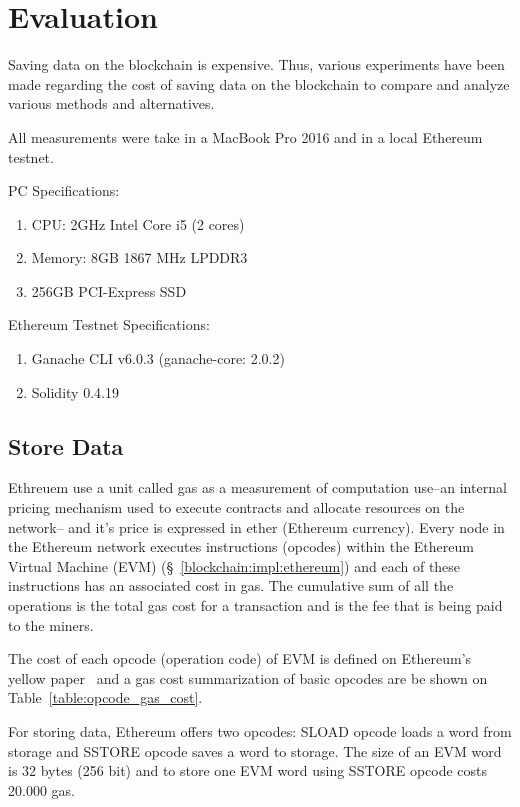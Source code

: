 \chapter{Evaluation}
\label{evaluation}

Saving data on the blockchain is expensive. Thus, various experiments have been made regarding the cost of saving data on the blockchain to compare and analyze various methods and alternatives.

All measurements were take in a MacBook Pro 2016 and in a local Ethereum testnet.

PC Specifications:

\begin{enumerate}
  \item CPU: 2GHz Intel Core i5 (2 cores)
  \item Memory: 8GB 1867 MHz LPDDR3
  \item 256GB PCI-Express SSD
\end{enumerate}

Ethereum Testnet Specifications:

\begin{enumerate}
  \item Ganache CLI v6.0.3 (ganache-core: 2.0.2)
  \item Solidity 0.4.19
\end{enumerate}

\section{Store Data}
\label{evaluation:store_data}

Ethreuem use a unit called gas as a measurement of computation use--an internal pricing mechanism used to execute contracts and allocate resources on the network-- and it's price is expressed in ether (Ethereum currency). Every node in the Ethereum network executes instructions (opcodes) within the Ethereum Virtual Machine (EVM) (§~\ref{blockchain:impl:ethereum}) and each of these instructions has an associated cost in gas. The cumulative sum of all the operations is the total gas cost for a transaction and is the fee that is being paid to the miners.

The cost of each opcode (operation code) of EVM is defined on Ethereum's yellow paper~\cite{ethereum_yellowpaper} and a gas cost summarization of basic opcodes are be shown on Table~\ref{table:opcode_gas_cost}.

For storing data, Ethereum offers two opcodes: SLOAD opcode loads a word from storage and SSTORE opcode saves a word to storage. The size of an EVM word is 32 bytes (256 bit) and to store one EVM word using SSTORE opcode costs 20.000 gas.

